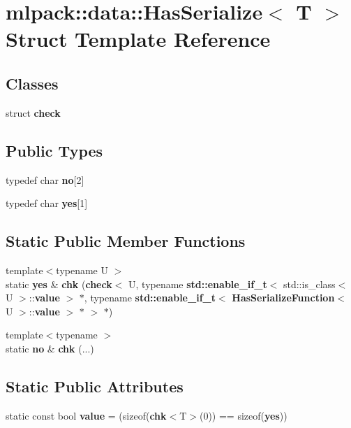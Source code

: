 \section{mlpack\+:\+:data\+:\+:Has\+Serialize$<$ T $>$ Struct Template Reference}
\label{structmlpack_1_1data_1_1HasSerialize}
\subsection*{Classes}
\begin{DoxyCompactItemize}
\item 
struct {\bf check}
\end{DoxyCompactItemize}
\subsection*{Public Types}
\begin{DoxyCompactItemize}
\item 
typedef char {\bf no}[2]
\item 
typedef char {\bf yes}[1]
\end{DoxyCompactItemize}
\subsection*{Static Public Member Functions}
\begin{DoxyCompactItemize}
\item 
{\footnotesize template$<$typename U $>$ }\\static {\bf yes} \& {\bf chk} ({\bf check}$<$ U, typename {\bf std\+::enable\+\_\+if\+\_\+t}$<$ std\+::is\+\_\+class$<$ U $>$\+::{\bf value} $>$ $\ast$, typename {\bf std\+::enable\+\_\+if\+\_\+t}$<$ {\bf Has\+Serialize\+Function}$<$ U $>$\+::{\bf value} $>$ $\ast$ $>$ $\ast$)
\item 
{\footnotesize template$<$typename $>$ }\\static {\bf no} \& {\bf chk} (...)
\end{DoxyCompactItemize}
\subsection*{Static Public Attributes}
\begin{DoxyCompactItemize}
\item 
static const bool {\bf value} = (sizeof({\bf chk}$<$T$>$(0)) == sizeof({\bf yes}))
\end{DoxyCompactItemize}


